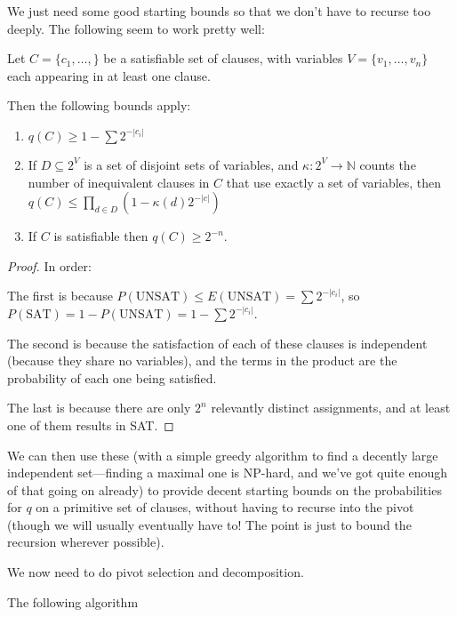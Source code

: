 We just need some good starting bounds so that we don't have to recurse too deeply.
The following seem to work pretty well:

\begin{lemma}
Let \(C = \{c_1, \ldots, \}\) be a satisfiable set of clauses,
with variables \(V = \{v_1, \ldots, v_n\}\) each appearing in at least one clause.

Then the following bounds apply:

\begin{enumerate}
\item \(q(C) \geq 1 - \sum 2^{-|c_i|}\)
\item If \(D \subseteq 2^V\) is a set of disjoint sets of variables,
and \(\kappa: 2^V \to \mathbb{N}\) counts the number of inequivalent clauses in \(C\) that use exactly a set of variables,
then \(q(C) \leq \prod\limits_{d \in D} (1 - \kappa(d) 2^{-|c|})\)
\item If \(C\) is satisfiable then \(q(C) \geq 2^{-n}\).
\end{enumerate}
\end{lemma}

\begin{proof}
In order:

The first is because \(P(\text{UNSAT}) \leq E(\text{UNSAT}) = \sum 2^{-|c_i|}\),
so \(P(\text{SAT}) = 1 - P(\text{UNSAT}) = 1 - \sum 2^{-|c_i|}\).

The second is because the satisfaction of each of these clauses is independent (because they share no variables),
and the terms in the product are the probability of each one being satisfied.

The last is because there are only \(2^{n}\) relevantly distinct assignments,
and at least one of them results in SAT.
\end{proof}

We can then use these (with a simple greedy algorithm to find a decently large independent set---finding a maximal one is NP-hard,
and we've got quite enough of that going on already) to provide decent starting bounds on the probabilities for \(q\) on a primitive set of clauses,
without having to recurse into the pivot (though we will usually eventually have to! The point is just to bound the recursion wherever possible).

We now need to do pivot selection and decomposition.

The following algorithm 


